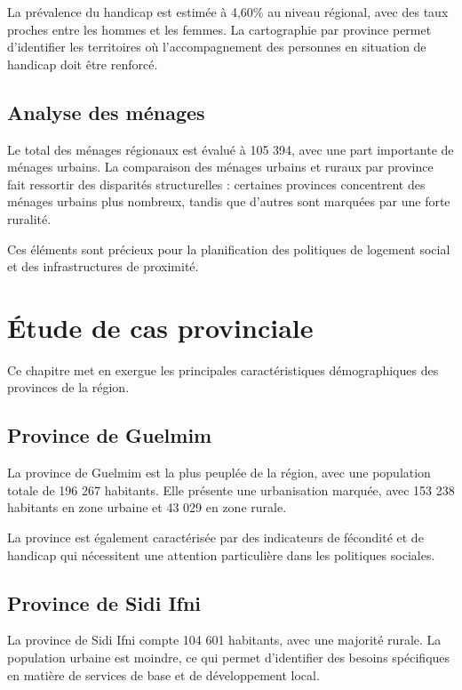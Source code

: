 \documentclass[12pt,a4paper,oneside]{report}
\begin{document}
La prévalence du handicap est estimée à 4,60\% au niveau régional, avec des taux proches entre les hommes et les femmes. La cartographie par province permet d'identifier les territoires où l'accompagnement des personnes en situation de handicap doit être renforcé.

\section{Analyse des ménages}

Le total des ménages régionaux est évalué à 105 394, avec une part importante de ménages urbains. La comparaison des ménages urbains et ruraux par province fait ressortir des disparités structurelles : certaines provinces concentrent des ménages urbains plus nombreux, tandis que d'autres sont marquées par une forte ruralité.

Ces éléments sont précieux pour la planification des politiques de logement social et des infrastructures de proximité.

\chapter{Étude de cas provinciale}

Ce chapitre met en exergue les principales caractéristiques démographiques des provinces de la région.

\section{Province de Guelmim}

La province de Guelmim est la plus peuplée de la région, avec une population totale de 196 267 habitants. Elle présente une urbanisation marquée, avec 153 238 habitants en zone urbaine et 43 029 en zone rurale.

La province est également caractérisée par des indicateurs de fécondité et de handicap qui nécessitent une attention particulière dans les politiques sociales.

\section{Province de Sidi Ifni}

La province de Sidi Ifni compte 104 601 habitants, avec une majorité rurale. La population urbaine est moindre, ce qui permet d'identifier des besoins spécifiques en matière de services de base et de développement local.
\end{document}
